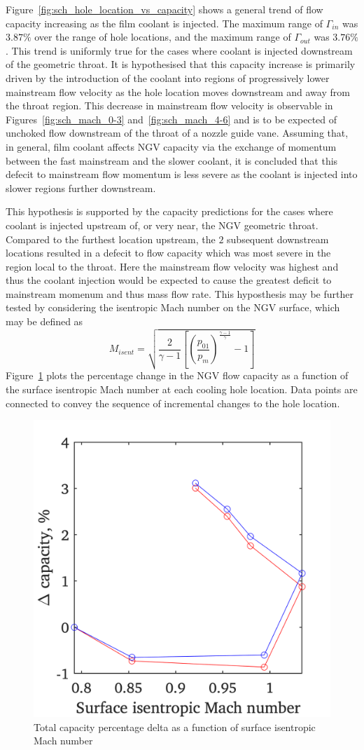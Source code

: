 \documentclass[a4paper, 11pt, oneside]{report}
\begin{document}
Figure~\ref{fig:sch_hole_location_vs_capacity} shows a general trend of flow capacity increasing as the film coolant is injected. The maximum range of $\Gamma_{in}$ was $3.87\%$ over the range of hole locations, and the maximum range of $\Gamma_{out}$ was $3.76\%$. This trend is uniformly true for the cases where coolant is injected downstream of the geometric throat. It is hypothesised that this capacity increase is primarily driven by the introduction of the coolant into regions of progressively lower mainstream flow velocity as the hole location moves downstream and away from the throat region. This decrease in mainstream flow velocity is observable in Figures~\ref{fig:sch_mach_0-3} and~\ref{fig:sch_mach_4-6} and is to be expected of unchoked flow downstream of the throat of a nozzle guide vane. Assuming that, in general, film coolant affects NGV capacity via the exchange of momentum between the fast mainstream and the slower coolant, it is concluded that this defecit to mainstream flow momentum is less severe as the coolant is injected into slower regions further downstream.

This hypothesis is supported by the capacity predictions for the cases where coolant is injected upstream of, or very near, the NGV geometric throat. Compared to the furthest location upstream, the $2$ subsequent downstream locations resulted in a defecit to flow capacity which was most severe in the region local to the throat. Here the mainstream flow velocity was highest and thus the coolant injection would be expected to cause the greatest deficit to mainstream momenum and thus mass flow rate. This hyposthesis may be further tested by considering the isentropic Mach number on the NGV surface, which may be defined as
\begin{equation}
M_{isent} =
\sqrt{
	\frac{2}{\gamma-1}
	\left[
		\left(
			\frac{p_{01}}{p_m}
		\right)
		^{\frac{\gamma-1}{\gamma}}
		-1
	\right]
}
\end{equation}
Figure~\ref{fig:sch_surface_isentropic_mach_number_vs_capacity} plots the percentage change in the NGV flow capacity as a function of the surface isentropic Mach number at each cooling hole location. Data points are connected to convey the sequence of incremental changes to the hole location.

\begin{figure}[H]
      \centering
      \includegraphics[width=.45\textwidth]{figs/sch_surface_isentropic_mach_number_vs_capacity.png}
      \caption{Total capacity percentage delta as a function of surface isentropic Mach number}
      \label{fig:sch_surface_isentropic_mach_number_vs_capacity}
\end{figure}
\end{document}

